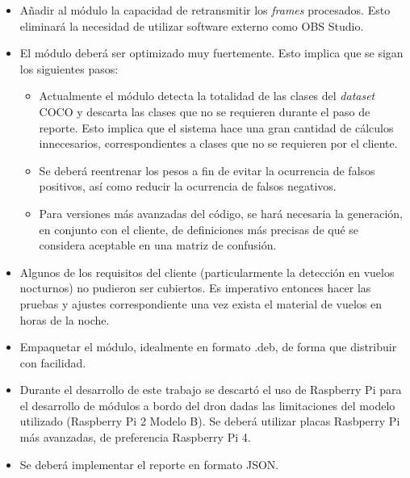 \begin{itemize}

	\item Añadir al módulo la capacidad de retransmitir los \textit{frames} procesados. Esto eliminará la necesidad de utilizar software externo como OBS Studio.
	\item El módulo deberá ser optimizado muy fuertemente. Esto implica que se sigan los siguientes pasos:
	
	\begin{itemize}
		
		\item Actualmente el módulo detecta la totalidad de las clases del \textit{dataset} COCO y descarta las clases que no se requieren durante el paso de reporte. Esto implica que el sistema hace una gran cantidad de cálculos innecesarios, correspondientes a clases que no se requieren por el cliente. 		
		
		\item Se deberá reentrenar los pesos a fin de evitar la ocurrencia de falsos positivos, así como reducir la ocurrencia de falsos negativos.
		
		\item Para versiones más avanzadas del código, se hará necesaria la generación, en conjunto con el cliente, de definiciones más precisas de qué se considera aceptable en una matriz de confusión. 
		
	\end{itemize}
	
	\item Algunos de los requisitos del cliente (particularmente la detección en vuelos nocturnos) no pudieron ser cubiertos. Es imperativo entonces hacer las pruebas y ajustes correspondiente una vez exista el material de vuelos en horas de la noche.
	
	\item Empaquetar el módulo, idealmente en formato .deb, de forma que distribuir con facilidad. 
	
	\item Durante el desarrollo de este trabajo se descartó el uso de Raspberry Pi para el desarrollo de módulos a bordo del dron dadas las limitaciones del modelo utilizado (Raspberry Pi 2 Modelo B). Se deberá utilizar placas Rasbperry Pi más avanzadas, de preferencia Raspberry Pi 4. 
	
	\item Se deberá implementar el reporte en formato JSON. 

\end{itemize}